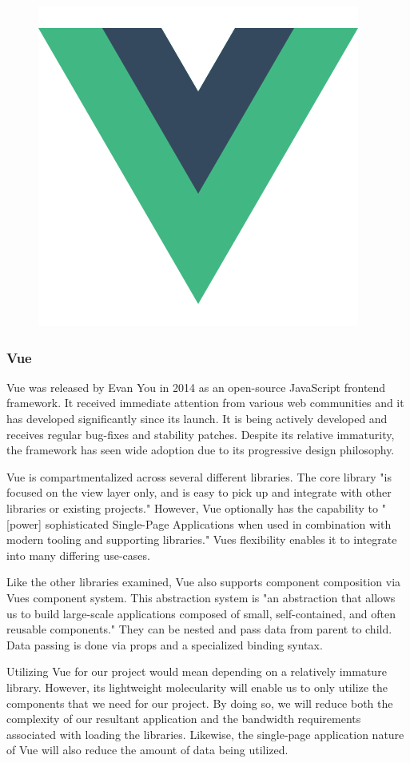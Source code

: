 \documentclass[12pt]{article}
\begin{document}
\begin{figure}[h]
	\centering
	\includegraphics[width=0.25\linewidth]{vue}
\end{figure}

\subsubsection{Vue}

Vue was released by Evan You in 2014 as an open-source JavaScript frontend framework.\cite{vuelaunch} It received immediate attention from various web communities and it has developed significantly since its launch. It is being actively developed and receives regular bug-fixes and stability patches. Despite its relative immaturity, the framework has seen wide adoption due to its progressive design philosophy.

Vue is compartmentalized across several different libraries. The core library "is focused on the view layer only, and is easy to pick up and integrate with other libraries or existing projects." \cite{vueguide} However, Vue optionally has the capability to "[power] sophisticated Single-Page Applications when used in combination with modern tooling and supporting libraries."\cite{vueguide} Vues flexibility enables it to integrate into many differing use-cases.

Like the other libraries examined, Vue also supports component composition via Vues component system. This abstraction system is "an abstraction that allows us to build large-scale applications composed of small, self-contained, and often reusable components."\cite{vueguide} They can be nested and pass data from parent to child. Data passing is done via props and a specialized binding syntax.

Utilizing Vue for our project would mean depending on a relatively immature library. However, its lightweight molecularity will enable us to only utilize the components that we need for our project. By doing so, we will reduce both the complexity of our resultant application and the bandwidth requirements associated with loading the libraries. Likewise, the single-page application nature of Vue will also reduce the amount of data being utilized.
\end{document}

